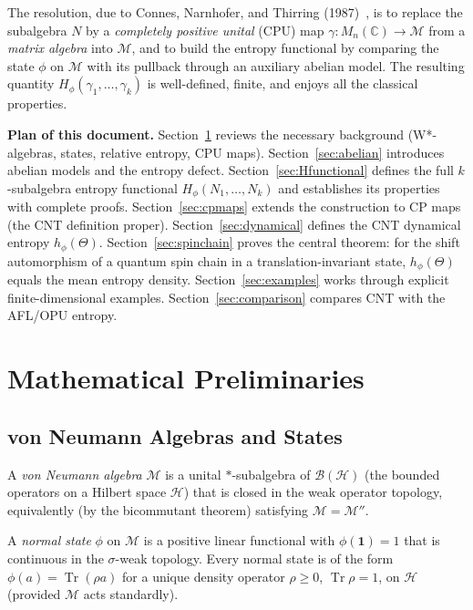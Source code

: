 \documentclass[12pt,a4paper]{article}
\newcommand{\CC}{\mathbb{C}}
\newcommand{\Tr}{\operatorname{Tr}}
\newcommand{\id}{\mathbf{1}}  %
\newcommand{\Hil}{\mathcal{H}}
\newcommand{\Mn}{M_n(\CC)}
\newcommand{\vN}{\mathcal{M}}      %
\newcommand{\Hphi}{H_{\phi}}
\begin{document}
The resolution, due to Connes, Narnhofer, and Thirring (1987)~\cite{cnt87}, is to replace
the subalgebra $N$ by a \emph{completely positive unital} (CPU) map
$\gamma: \Mn\to\vN$ from a \emph{matrix algebra} into $\vN$, and to build the
entropy functional by comparing the state $\phi$ on $\vN$ with its pullback through
an auxiliary abelian model.  The resulting quantity $\Hphi(\gamma_1,\ldots,\gamma_k)$
is well-defined, finite, and enjoys all the classical properties.

\medskip\noindent\textbf{Plan of this document.}
Section~\ref{sec:prelim} reviews the necessary background (W*-algebras, states, relative
entropy, CPU maps).  Section~\ref{sec:abelian} introduces abelian models and the entropy
defect.  Section~\ref{sec:Hfunctional} defines the full $k$-subalgebra entropy functional
$\Hphi(N_1,\ldots,N_k)$ and establishes its properties with complete proofs.
Section~\ref{sec:cpmaps} extends the construction to CP maps (the CNT definition proper).
Section~\ref{sec:dynamical} defines the CNT dynamical entropy $h_\phi(\Theta)$.
Section~\ref{sec:spinchain} proves the central theorem: for the shift automorphism of
a quantum spin chain in a translation-invariant state, $h_\phi(\Theta)$ equals the mean
entropy density.  Section~\ref{sec:examples} works through explicit finite-dimensional
examples.  Section~\ref{sec:comparison} compares CNT with the AFL/OPU entropy.

\section{Mathematical Preliminaries}
\label{sec:prelim}

\subsection{von Neumann Algebras and States}

A \emph{von Neumann algebra} $\vN$ is a unital $*$-subalgebra of $\mathcal{B}(\Hil)$
(the bounded operators on a Hilbert space $\Hil$) that is closed in the weak operator
topology, equivalently (by the bicommutant theorem) satisfying $\vN = \vN''$.

A \emph{normal state} $\phi$ on $\vN$ is a positive linear functional with
$\phi(\id)=1$ that is continuous in the $\sigma$-weak topology.  Every normal state is
of the form $\phi(a)=\Tr(\rho a)$ for a unique density operator $\rho\ge 0$,
$\Tr\rho=1$, on $\Hil$ (provided $\vN$ acts standardly).
\end{document}
